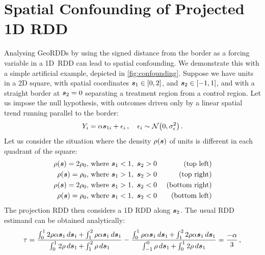 \section{Spatial Confounding of Projected 1D RDD}
\label{sec:confounding}

	Analysing GeoRDDs by using the signed distance from the border as a forcing variable in a 1D~RDD can lead to spatial confounding.
We demonstrate this with a simple artificial example, depicted in \autoref{fig:confounding}.
Suppose we have units in a 2D square, with spatial coordinates \(\bm{s}_1 \in [0,2]\), and \(\bm{s}_2 \in [-1,1]\), and with a straight border at \(\bm{s}_2=0\) separating a treatment region from a control region.
Let us impose the null hypothesis, with outcomes driven only by a linear spatial trend running parallel to the border:
\begin{equation}
    Y_{i} = \alpha \svec_{1i} + \epsilon_i \,,\quad\epsilon_i \sim \normal\del{0, \sigman^2}
    \,.
\end{equation}
Let us consider the situation where the density \(\rho(\bm{s})\) of units is different in each quadrant of the square:
\begin{equation}
    \begin{aligned}
        \rho(\bm{s}) = 2\rho_0 & \text{, where }\bm{s}_1 < 1,~\bm{s}_2 > 0 & \text{ (top left)} \\
        \rho(\bm{s}) = \rho_0 & \text{, where }\bm{s}_1 > 1,~\bm{s}_2 > 0 & \text{ (top right)} \\
        \rho(\bm{s}) = 2\rho_0 & \text{, where }\bm{s}_1 > 1,~\bm{s}_2 < 0 & \text{ (bottom right)}  \\
        \rho(\bm{s}) = \rho_0 & \text{, where }\bm{s}_1 < 1,~\bm{s}_2 < 0 & \text{ (bottom left)}
    \end{aligned}
\end{equation}
The projection RDD then considers a 1D RDD along \(\bm{s}_2\).
The usual RDD estimand  can be obtained analytically:
\begin{equation}
    \tau = \frac{
            \int_{0}^{1}  2\rho \alpha \bm{s}_{1} \mathop{d \bm{s}}_{1} 
            + \int_{1}^{2}  \rho \alpha \bm{s}_{1} \mathop{d \bm{s}}_{1}
        }{
            \int_{0}^{1}  2\rho \mathop{d \bm{s}}_{1} 
            + \int_{1}^{2}  \rho \mathop{d \bm{s}}_{1}
        }
        -
        \frac{
            \int_{0}^{1} \rho \alpha \bm{s}_{1} \mathop{d \bm{s}}_{1} 
            + \int_{1}^{2} 2\rho \alpha \bm{s}_{1} \mathop{d \bm{s}}_{1}
        }{
            \int_{-1}^{0} \rho \mathop{d \bm{s}}_{1} 
            + \int_{0}^{1} 2\rho \mathop{d \bm{s}}_{1}
        }
    = \frac{-\alpha}{3}
    \,,
\end{equation}
